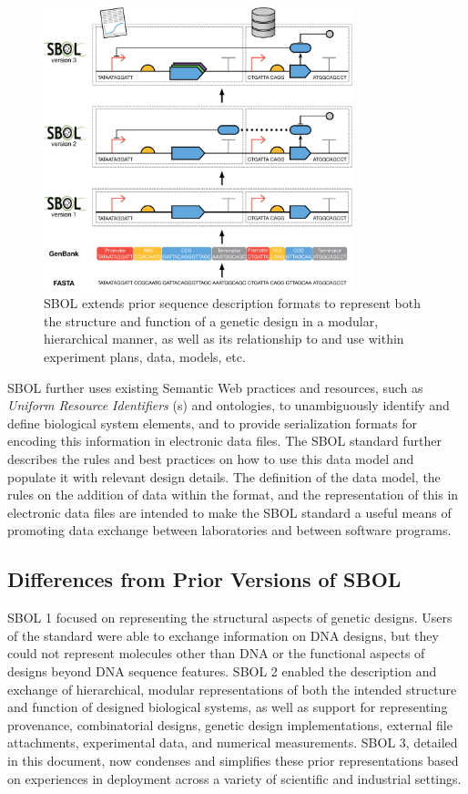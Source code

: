 \begin{figure}[htbp!]
\centering
\includegraphics[width=0.8\textwidth]{images/SBOL3-evolution.pdf}
\caption{SBOL extends prior sequence description formats to represent both the structure and function of a genetic design in a modular, hierarchical manner, as well as its relationship to and use within experiment plans, data, models, etc.}
\label{f:sequence}
\end{figure}

SBOL further uses existing Semantic Web practices and resources, such as \emph{Uniform Resource Identifiers} (s) and ontologies, to unambiguously identify and define biological system elements,
and to provide serialization formats for encoding this information in electronic data files.
The SBOL standard further describes the rules and best practices on how to use this data model and populate it with relevant design details. 
The definition of the data model, the rules on the addition of data within the format, and the representation of this in electronic data files are intended to make the SBOL standard a useful means of promoting data exchange between laboratories and between software programs.

\subsection*{Differences from Prior Versions of SBOL}

SBOL 1 focused on representing the structural aspects of genetic designs. Users of the standard were able to exchange information on DNA designs, but they could not represent molecules other than DNA or the functional aspects of designs beyond DNA sequence features. SBOL 2 enabled the description and exchange of hierarchical, modular representations of both the intended structure and function of designed biological systems, as well as support for representing provenance, combinatorial designs, genetic design implementations, external file attachments, experimental data, and numerical measurements. 
SBOL 3, detailed in this document, now condenses and simplifies these prior representations based on experiences in deployment across a variety of scientific and industrial settings.

